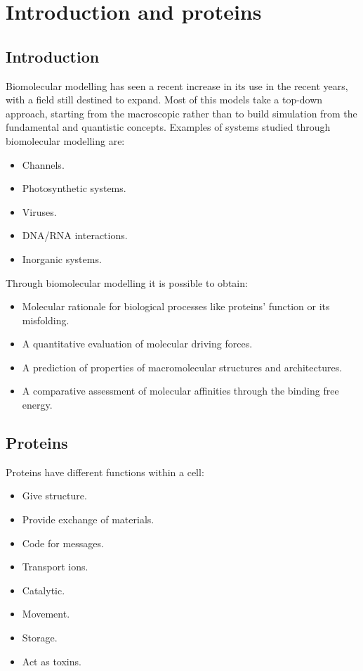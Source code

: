 \chapter{Introduction and proteins}

\section{Introduction}
Biomolecular modelling  has seen a recent increase in its use in the recent years, with a field still destined to expand.
Most of this models take a top-down approach, starting from the macroscopic rather than to build simulation from the fundamental and quantistic concepts.
Examples of systems studied through biomolecular modelling are:

\begin{multicols}{2}
	\begin{itemize}
		\item Channels.
		\item Photosynthetic systems.
		\item Viruses.
		\item DNA/RNA interactions.
		\item Inorganic systems.
	\end{itemize}
\end{multicols}

Through biomolecular modelling it is possible to obtain:

\begin{multicols}{2}
	\begin{itemize}
		\item Molecular rationale for biological processes like proteins' function or its misfolding.
		\item A quantitative evaluation of molecular driving forces.
		\item A prediction of properties of macromolecular structures and architectures.
		\item A comparative assessment of molecular affinities through the binding free energy.
	\end{itemize}
\end{multicols}

\section{Proteins}
Proteins have different functions within a cell:

\begin{multicols}{2}
	\begin{itemize}
		\item Give structure.
		\item Provide exchange of materials.
		\item Code for messages.
		\item Transport ions.
		\item Catalytic.
		\item Movement.
		\item Storage.
		\item Act as toxins.
	\end{itemize}
\end{multicols}

